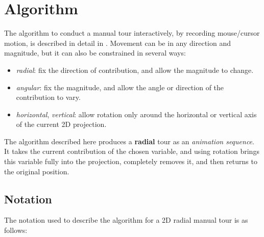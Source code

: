 \documentclass{template/monashthesis}
\begin{document}
\hypertarget{sec:algorithm}{%
\section{Algorithm}\label{sec:algorithm}}

The algorithm to conduct a manual tour interactively, by recording mouse/cursor motion, is described in detail in \textcite{cook_manual_1997}. Movement can be in any direction and magnitude, but it can also be constrained in several ways:

\begin{itemize}
\tightlist
\item
  \emph{radial}: fix the direction of contribution, and allow the magnitude to change.
\item
  \emph{angular}: fix the magnitude, and allow the angle or direction of the contribution to vary.
\item
  \emph{horizontal}, \emph{vertical}: allow rotation only around the horizontal or vertical axis of the current 2D projection.
\end{itemize}

The algorithm described here produces a \textbf{radial} tour as an \emph{animation sequence}. It takes the current contribution of the chosen variable, and using rotation brings this variable fully into the projection, completely removes it, and then returns to the original position.

\hypertarget{notation}{%
\subsection{Notation}\label{notation}}

The notation used to describe the algorithm for a 2D radial manual tour is as follows:
\end{document}
